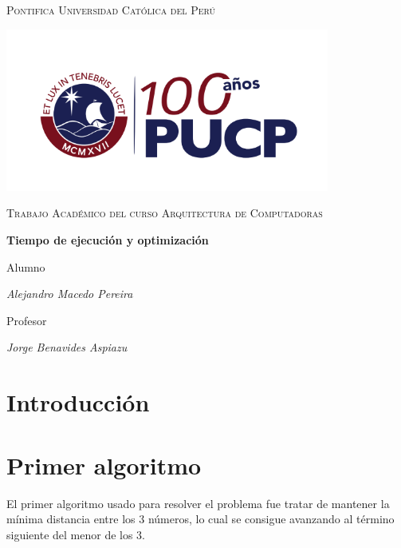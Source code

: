 \documentclass[12pt, twoclumn]{article}
\begin{document}
\begin{titlepage}
   \centering
   {\scshape\LARGE Pontifica Universidad Católica del Perú \par}
   \includegraphics[width=0.8\textwidth]{img/logo}\par
   \vspace{1cm}
   {\scshape\Large Trabajo Académico del curso Arquitectura de Computadoras\par}
   \vspace{1.5cm}
   {\huge\bfseries Tiempo de ejecución y optimización \par}
   \vspace{2cm}
   {\Huge Alumno \par}
   \vspace{0.5cm}
   {\Large\itshape Alejandro Macedo Pereira \par}
   \vspace{2cm}
   {\Huge Profesor \par}
   \vspace{0.5cm}
   {\Large\itshape Jorge Benavides Aspiazu \par}
   \vfill
   {\Large {} \par}
\end{titlepage}

\section{Introducción}

\section{Primer algoritmo}
El primer algoritmo usado para resolver el problema fue tratar de mantener la mínima distancia entre los 3 números, lo cual
se consigue avanzando al término siguiente del menor de los 3.
\end{document}
